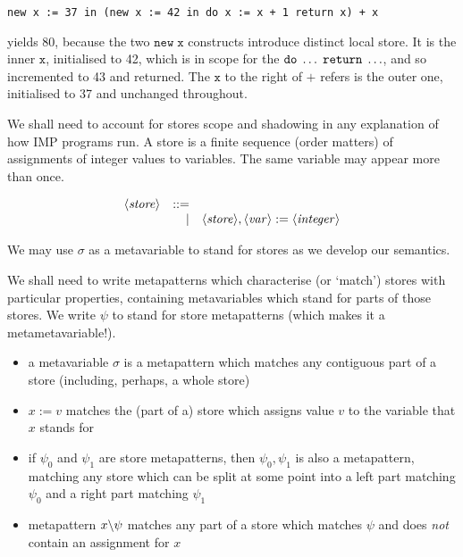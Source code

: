 \documentclass{article}
\begin{document}
\begin{verbatim}
new x := 37 in (new x := 42 in do x := x + 1 return x) + x
\end{verbatim}

yields 80, because the two $\mathtt{new\;x}$ constructs introduce distinct local store. It is the inner $\mathtt{x}$, initialised to 42, which is in scope for the $\mathtt{do}\;\ldots\;\mathtt{return}\;\ldots$, and so incremented to 43 and returned. The $\mathtt{x}$ to the right of $+$ refers is the outer one, initialised to 37 and unchanged throughout.

We shall need to account for stores scope and shadowing in any explanation of how IMP programs run. A store is a finite sequence (order matters) of assignments of integer values to variables. The same variable may appear more than once.

\[\begin{array}{rrl}
    \langle \mathit{store} \rangle & ::= & \\
               &   | & \langle \mathit{store} \rangle, \langle \mathit{var} \rangle := \langle \mathit{integer} \rangle
\end{array}\]

We may use $\sigma$ as a metavariable to stand for stores as we develop our semantics.

We shall need to write metapatterns which characterise (or `match') stores with particular properties, containing metavariables which stand for parts of those stores. We write $\psi$ to stand for store metapatterns (which makes it a metametavariable!).
\begin{itemize}
\item a metavariable $\sigma$ is a metapattern which matches any contiguous part of a store (including, perhaps, a whole store)
\item $x := v$ matches the (part of a) store which assigns value $v$ to the variable that $x$ stands for
\item if $\psi_0$ and $\psi_1$ are store metapatterns, then $\psi_0,\psi_1$ is also a metapattern, matching any store which can be split at some point into a left part matching $\psi_0$ and a right part matching $\psi_1$
\item metapattern $x \backslash \psi$ matches any part of a store which matches $\psi$ and does \emph{not} contain an assignment for $x$
\end{itemize}
\end{document}
